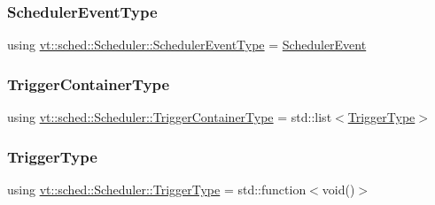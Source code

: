 \mbox{\label{structvt_1_1sched_1_1_scheduler_ad40b8136b7810da5bab9b27e317e4eb3}} 
\subsubsection{\texorpdfstring{Scheduler\+Event\+Type}{SchedulerEventType}}
{\footnotesize\ttfamily using \hyperlink{namespacevt_1_1sched_a54756ec39b60951d6765fcfa692d1616}{vt\+::sched\+::\+Scheduler\+::\+Scheduler\+Event\+Type} =  \hyperlink{namespacevt_1_1sched_a54756ec39b60951d6765fcfa692d1616}{Scheduler\+Event}}

\mbox{\label{structvt_1_1sched_1_1_scheduler_a0b9fe2a5ee31ca84fa52764a126ad666}} 
\subsubsection{\texorpdfstring{Trigger\+Container\+Type}{TriggerContainerType}}
{\footnotesize\ttfamily using \hyperlink{structvt_1_1sched_1_1_scheduler_a0b9fe2a5ee31ca84fa52764a126ad666}{vt\+::sched\+::\+Scheduler\+::\+Trigger\+Container\+Type} =  std\+::list$<$\hyperlink{structvt_1_1sched_1_1_scheduler_aa0c06d6e1c31a5f1c3db474036ad7d29}{Trigger\+Type}$>$}

\mbox{\label{structvt_1_1sched_1_1_scheduler_aa0c06d6e1c31a5f1c3db474036ad7d29}} 
\subsubsection{\texorpdfstring{Trigger\+Type}{TriggerType}}
{\footnotesize\ttfamily using \hyperlink{structvt_1_1sched_1_1_scheduler_aa0c06d6e1c31a5f1c3db474036ad7d29}{vt\+::sched\+::\+Scheduler\+::\+Trigger\+Type} =  std\+::function$<$void()$>$}

